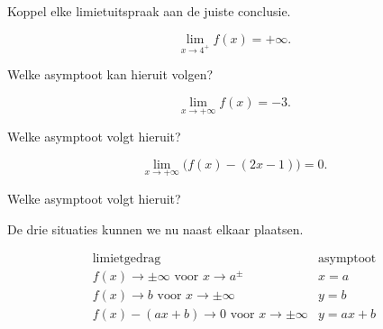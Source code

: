 \documentclass{ximera}
\begin{document}
\begin{oefening}{\oefB\ESS}

Koppel elke limietuitspraak aan de juiste conclusie.

\begin{question}

\[
\lim_{x\to4^+}f(x)=+\infty.
\]

Welke asymptoot kan hieruit volgen?

\begin{multipleChoice}
\end{multipleChoice}

\end{question}

\begin{question}

\[
\lim_{x\to+\infty}f(x)=-3.
\]

Welke asymptoot volgt hieruit?

\begin{multipleChoice}
\end{multipleChoice}

\end{question}

\begin{question}

\[
\lim_{x\to+\infty}
\bigl(f(x)-(2x-1)\bigr)=0.
\]

Welke asymptoot volgt hieruit?

\begin{multipleChoice}
\end{multipleChoice}

\end{question}

\end{oefening}




De drie situaties kunnen we nu naast elkaar plaatsen.

\[
\boxed{
\begin{array}{c|c}
\text{limietgedrag}
&
\text{asymptoot}
\\ \hline
f(x)\to\pm\infty
\text{ voor }x\to a^\pm
&
x=a
\\[2mm]
f(x)\to b
\text{ voor }x\to\pm\infty
&
y=b
\\[2mm]
f(x)-(ax+b)\to0
\text{ voor }x\to\pm\infty
&
y=ax+b
\end{array}
}
\]
\end{document}
